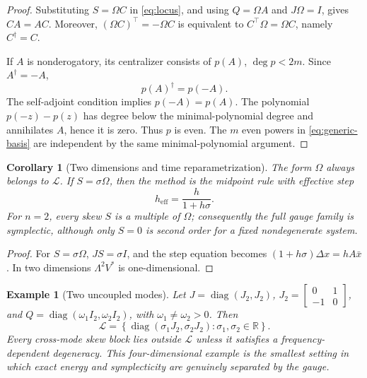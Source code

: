 \documentclass[11pt,a4paper]{article}
\newtheorem{corollary}[theorem]{Corollary}
\newtheorem{example}[theorem]{Example}
\newcommand{\R}{\mathbb R}
\newcommand{\cL}{\mathcal L}
\newcommand{\diag}{\operatorname{diag}}
\begin{document}
\begin{proof}
Substituting \(S=\Omega C\) in \cref{eq:locus}, and using
\(Q=\Omega A\) and \(J\Omega=I\), gives \(CA=AC\). Moreover,
\((\Omega C)^\top=-\Omega C\) is equivalent to
\(C^\top\Omega=\Omega C\), namely \(C^\dagger=C\).

If \(A\) is nonderogatory, its centralizer consists of
\(p(A)\), \(\deg p<2m\). Since \(A^\dagger=-A\),
\[
 p(A)^\dagger=p(-A).
\]
The self-adjoint condition implies \(p(-A)=p(A)\). The polynomial
\(p(-z)-p(z)\) has degree below the minimal-polynomial degree and
annihilates \(A\), hence it is zero. Thus \(p\) is even. The \(m\) even
powers in \cref{eq:generic-basis} are independent by the same
minimal-polynomial argument.
\end{proof}

\begin{corollary}[Two dimensions and time reparametrization]
\label{cor:two-dimensional}
The form \(\Omega\) always belongs to \(\cL\). If \(S=\sigma\Omega\),
then the method is the midpoint rule with effective step
\[
 h_{\mathrm{eff}}=\frac{h}{1+h\sigma}.
\]
For \(n=2\), every skew \(S\) is a multiple of \(\Omega\); consequently
the full gauge family is symplectic, although only \(S=0\) is second order
for a fixed nondegenerate system.
\end{corollary}

\begin{proof}
For \(S=\sigma\Omega\), \(JS=\sigma I\), and the step equation becomes
\((1+h\sigma)\Delta x=hA\bar x\). In two dimensions
\(\Lambda^2V^*\) is one-dimensional.
\end{proof}

\begin{example}[Two uncoupled modes]\label{ex:two-modes}
Let \(J=\diag(J_2,J_2)\),
\(J_2=\left[\begin{smallmatrix}0&1\\-1&0\end{smallmatrix}\right]\), and
\(Q=\diag(\omega_1I_2,\omega_2I_2)\), with
\(\omega_1\ne\omega_2>0\). Then
\[
 \cL=\left\{\diag(\sigma_1J_2,\sigma_2J_2):
 \sigma_1,\sigma_2\in\R\right\}.
\]
Every cross-mode skew block lies outside \(\cL\) unless it satisfies a
frequency-dependent degeneracy. This four-dimensional example is the
smallest setting in which exact energy and symplecticity are genuinely
separated by the gauge.
\end{example}
\end{document}

